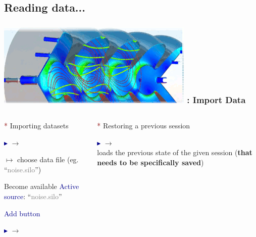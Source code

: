 
\subsection{Reading data...}
\begin{frame}
\frametitle{\href{https://wci.llnl.gov/simulation/computer-codes/visit/}{\includegraphics[height=.85cm]{figs/visit-logos/VisIt-02}} \hspace{-.85cm}{\bf \textcolor{lightgray}{VisIt}}: Import Data}

\begin{columns}
\begin{column}{6.25cm}
        \textcolor{DarkRed}{*} Importing datasets

        \textcolor{DarkBlue}{$\blacktriangleright$}
         $\rightarrow$ 

        \hspace{2mm} $\mapsto$ choose data file {\small (eg. ``\textcolor{gray}{noise.silo}'')}

        \pause
        \vspace{2mm}
        \begin{beamerboxesrounded}[upper=block head,lower=block body,shadow=true]{ Become available}
                \hspace{2mm}
                 \textcolor{DarkBlue}{Active source}: ``\textcolor{gray}{noise.silo}''

                \hspace{2mm}
                 \textcolor{DarkBlue}{Add button}
        \end{beamerboxesrounded}

        \pause
        \vspace{2mm}
        \textcolor{DarkBlue}{$\blacktriangleright$}
         $\rightarrow$ 
\end{column}
\begin{column}{5.5cm}
        \textcolor{DarkRed}{*} Restoring a previous session

        \vspace{2.5mm}
        \textcolor{DarkBlue}{$\blacktriangleright$}
         $\rightarrow$ 
        \\
        loads the previous state of the given session (\textbf{that needs to be specifically saved})


\end{column}
\end{columns}
\end{frame}
